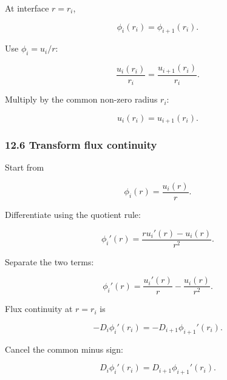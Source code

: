 \documentclass[11pt,a4paper]{article}
\begin{document}
At interface $r=r_i$,

\begin{equation}
\phi_i(r_i)=\phi_{i+1}(r_i).
\tag{TRISO-ML-437}
\label{eq:triso-ml-437}
\end{equation}

Use $\phi_i=u_i/r$:

\begin{equation}
\frac{u_i(r_i)}{r_i}
=
\frac{u_{i+1}(r_i)}{r_i}.
\tag{TRISO-ML-438}
\label{eq:triso-ml-438}
\end{equation}

Multiply by the common non-zero radius $r_i$:

\begin{equation}
\boxed{
u_i(r_i)=u_{i+1}(r_i).
}
\tag{TRISO-ML-439}
\label{eq:triso-ml-439}
\end{equation}

\subsubsection*{12.6 Transform flux continuity}

Start from

\begin{equation}
\phi_i(r)=\frac{u_i(r)}{r}.
\tag{TRISO-ML-440}
\label{eq:triso-ml-440}
\end{equation}

Differentiate using the quotient rule:

\begin{equation}
\phi_i'(r)
=
\frac{ru_i'(r)-u_i(r)}{r^2}.
\tag{TRISO-ML-441}
\label{eq:triso-ml-441}
\end{equation}

Separate the two terms:

\begin{equation}
\boxed{
\phi_i'(r)
=
\frac{u_i'(r)}{r}
-
\frac{u_i(r)}{r^2}.
}
\tag{TRISO-ML-442}
\label{eq:triso-ml-442}
\end{equation}

Flux continuity at $r=r_i$ is

\begin{equation}
-D_i\phi_i'(r_i)
=
-D_{i+1}\phi_{i+1}'(r_i).
\tag{TRISO-ML-443}
\label{eq:triso-ml-443}
\end{equation}

Cancel the common minus sign:

\begin{equation}
D_i\phi_i'(r_i)
=
D_{i+1}\phi_{i+1}'(r_i).
\tag{TRISO-ML-444}
\label{eq:triso-ml-444}
\end{equation}
\end{document}
